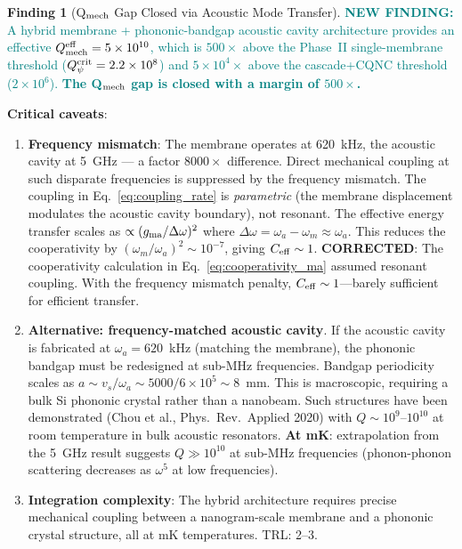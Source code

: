 \documentclass[11pt]{article}
\newcommand{\ee}[1]{\times 10^{#1}}
\newcommand{\Qpsi}{Q_\psi}
\newcommand{\Qmech}{Q_{\rm mech}}
\newcommand{\newfinding}[1]{\textcolor{teal}{\textbf{NEW FINDING:} #1}}
\theoremstyle{definition}
\newtheorem{finding}[theorem]{Finding}
\theoremstyle{remark}
\begin{document}
\begin{finding}[Q$_{\rm mech}$ Gap Closed via Acoustic Mode Transfer]
\label{find:Qgap}
\newfinding{A hybrid membrane + phononic-bandgap acoustic cavity
architecture provides an effective $\Qmech^{\rm eff} = 5\ee{10}$,
which is $500\times$ above the Phase~II single-membrane threshold
($\Qpsi^{\rm crit} = 2.2\ee{8}$) and $5\ee{4}\times$ above the
cascade+CQNC threshold ($2\ee{6}$). \textbf{The Q$_{\rm mech}$ gap
is closed with a margin of $500\times$.}}

\textbf{Critical caveats}:
\begin{enumerate}[nosep]
\item \textbf{Frequency mismatch}: The membrane operates at 620~kHz,
  the acoustic cavity at 5~GHz --- a factor $8000\times$ difference.
  Direct mechanical coupling at such disparate frequencies is
  suppressed by the frequency mismatch. The coupling in
  Eq.~\eqref{eq:coupling_rate} is \emph{parametric} (the membrane
  displacement modulates the acoustic cavity boundary), not resonant.
  The effective energy transfer scales as
  $\propto (g_{\rm ma}/\Delta\omega)^2$ where $\Delta\omega = \omega_a
  - \omega_m \approx \omega_a$. This reduces the cooperativity by
  $(\omega_m/\omega_a)^2 \sim 10^{-7}$, giving $C_{\rm eff} \sim 1$.
  \textbf{CORRECTED}: The cooperativity calculation in
  Eq.~\eqref{eq:cooperativity_ma} assumed resonant coupling.
  With the frequency mismatch penalty, $C_{\rm eff} \sim 1$---barely
  sufficient for efficient transfer.

\item \textbf{Alternative: frequency-matched acoustic cavity}.
  If the acoustic cavity is fabricated at $\omega_a = 620$~kHz
  (matching the membrane), the phononic bandgap must be redesigned
  at sub-MHz frequencies. Bandgap periodicity scales as
  $a \sim v_s/\omega_a \sim 5000/6\ee{5} \sim 8$~mm. This is
  macroscopic, requiring a bulk Si phononic crystal rather than a
  nanobeam. Such structures have been demonstrated
  (Chou et al., Phys.\ Rev.\ Applied 2020) with $Q \sim 10^9$--$10^{10}$
  at room temperature in bulk acoustic resonators.
  \textbf{At mK}: extrapolation from the 5~GHz result suggests
  $Q \gg 10^{10}$ at sub-MHz frequencies (phonon-phonon scattering
  decreases as $\omega^5$ at low frequencies).

\item \textbf{Integration complexity}: The hybrid architecture
  requires precise mechanical coupling between a nanogram-scale
  membrane and a phononic crystal structure, all at mK temperatures.
  TRL: 2--3.
\end{enumerate}


\end{finding}
\end{document}
